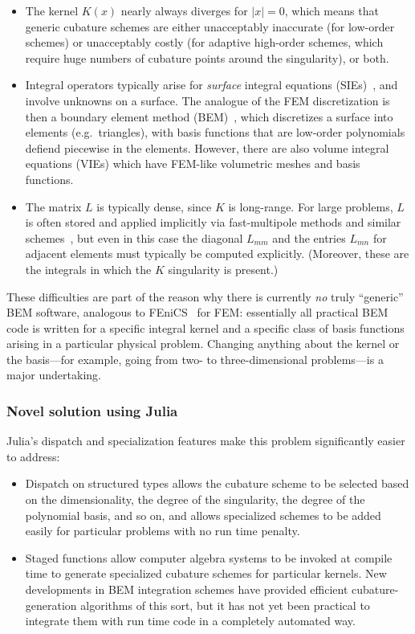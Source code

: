 \begin{itemize}
\item The kernel $K(x)$ nearly always diverges for $|x|=0$, which means that generic
cubature schemes are either unacceptably inaccurate (for low-order schemes) or
unacceptably costly (for adaptive high-order schemes, which require huge numbers
of cubature points around the singularity), or both.

\item Integral operators typically arise for \emph{surface} integral
equations (SIEs)~\cite{Bonnet99,Chew09}, and involve unknowns on a surface.
The analogue of the FEM discretization is then a boundary element method
(BEM)~\cite{Bonnet99,Chew09}, which discretizes a surface into elements
(e.g.\ triangles), with basis functions that are low-order
polynomials defiend piecewise in the elements.
However, there are also volume integral equations (VIEs) which have FEM-like
volumetric meshes and basis functions.

\item The matrix $L$ is typically dense, since $K$ is long-range.
For large problems, $L$ is often stored and applied implicitly via
fast-multipole methods and similar schemes~\cite{Chew01,Liu14}, but even in this
case the diagonal $L_{mm}$ and the entries $L_{mn}$ for adjacent
elements must typically be computed explicitly.
(Moreover, these are the integrals in which the $K$ singularity is present.)
\end{itemize}

These difficulties are part of the reason why there is currently \emph{no}
truly ``generic'' BEM software, analogous to FEniCS~\cite{FEniCS12} for FEM: essentially
all practical BEM code is written for a specific integral kernel and
a specific class of basis functions arising in a particular physical problem.
Changing anything about the kernel or the basis---for example, going
from two- to three-dimensional problems---is a major undertaking.

\subsubsection{Novel solution using Julia}

Julia's dispatch and specialization features make this problem
significantly easier to address:

\begin{itemize}
\item Dispatch on structured types allows the cubature scheme to be selected %
based on the dimensionality, the degree of the singularity, the degree of
the polynomial basis, and so on, and allows specialized schemes to be added
easily for particular problems with no run time penalty.

\item Staged functions allow computer algebra systems to be invoked at
compile time to generate specialized cubature schemes for particular
kernels.
New developments in BEM integration schemes \cite{ReidWhJo14} have
provided efficient cubature-generation algorithms of this sort, but it
has not yet been practical to integrate them with run time code in
a completely automated way.
\end{itemize}

